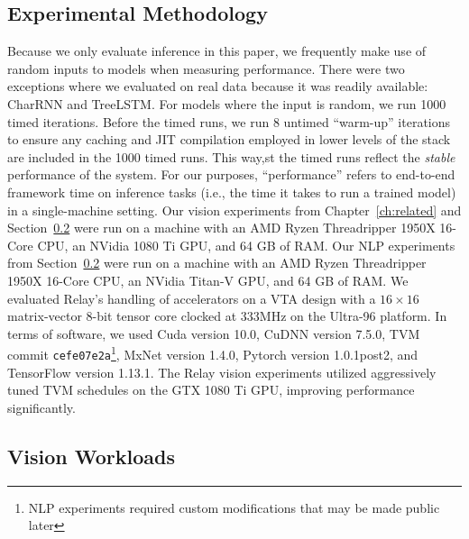 \subsection{Experimental Methodology}
  Because we only evaluate inference in this paper,
    we frequently make use of random inputs to models when measuring
    performance.
  There were two exceptions where we evaluated on real data because
    it was readily available: CharRNN and TreeLSTM.
  For models where the input is random,
    we run 1000 timed iterations.
  Before the timed runs,
    we run 8 untimed ``warm-up'' iterations to ensure any caching and JIT compilation
    employed in lower levels of the stack are included in the 1000 timed runs.
  This way,st
    the timed runs reflect the \textit{stable} performance of the system.
  For our purposes, ``performance'' refers to end-to-end framework time on
    inference tasks (i.e., the time it takes to run a trained model) in a
    single-machine setting.
  Our vision experiments from Chapter~\ref{ch:related} and Section~\ref{sec:perf-gpu} were run on a machine with an AMD Ryzen
    Threadripper 1950X 16-Core CPU,
    an NVidia 1080 Ti GPU,
    and 64 GB of RAM.
  Our NLP experiments from Section~\ref{sec:perf-gpu} were run on a machine with an AMD Ryzen
    Threadripper 1950X 16-Core CPU,
    an NVidia Titan-V GPU,
    and 64 GB of RAM.
  We evaluated Relay's handling of accelerators on a VTA design with a
    $16\times16$ matrix-vector 8-bit tensor core clocked at 333MHz on the Ultra-96 platform.
  In terms of software, we used
    Cuda version 10.0,
    CuDNN version 7.5.0,
    TVM commit \texttt{cefe07e2a}\footnote{NLP experiments required custom modifications that may be made public later},
    MxNet version 1.4.0,
    Pytorch version 1.0.1post2,
    and TensorFlow version 1.13.1.
  The Relay vision experiments utilized aggressively tuned TVM schedules on the GTX 1080 Ti GPU,
    improving performance significantly.

  \subsection{Vision Workloads}
  \label{sec:perf-gpu}


